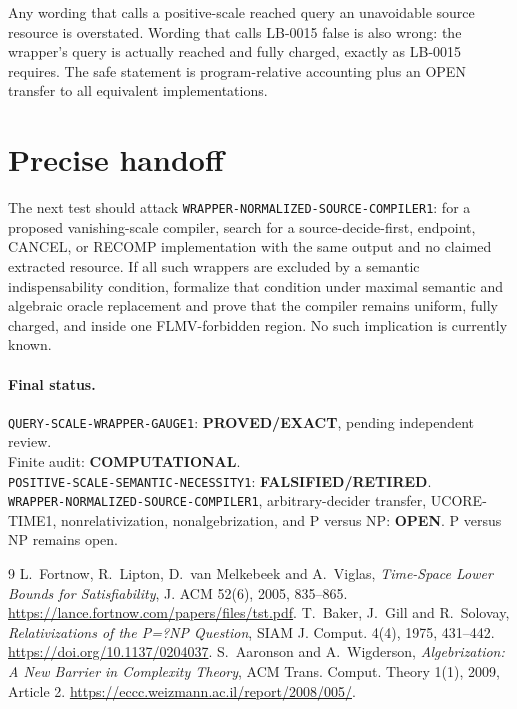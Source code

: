 \documentclass[11pt]{article}
\newcommand{\EXACT}{\textbf{PROVED/EXACT}}
\newcommand{\COMP}{\textbf{COMPUTATIONAL}}
\newcommand{\OPEN}{\textbf{OPEN}}
\newcommand{\RETIRED}{\textbf{FALSIFIED/RETIRED}}
\begin{document}
Any wording that calls a positive-scale reached query an unavoidable source
resource is overstated.  Wording that calls LB-0015 false is also wrong: the
wrapper's query is actually reached and fully charged, exactly as LB-0015
requires.  The safe statement is program-relative accounting plus an OPEN
transfer to all equivalent implementations.

\section{Precise handoff}

The next test should attack \texttt{WRAPPER-NORMALIZED-SOURCE-COMPILER1}:
for a proposed vanishing-scale compiler, search for a source-decide-first,
endpoint, CANCEL, or RECOMP implementation with the same output and no
claimed extracted resource.  If all such wrappers are excluded by a semantic
indispensability condition, formalize that condition under maximal semantic
and algebraic oracle replacement and prove that the compiler remains uniform,
fully charged, and inside one FLMV-forbidden region.  No such implication is
currently known.

\paragraph{Final status.}
\texttt{QUERY-SCALE-WRAPPER-GAUGE1}: \EXACT, pending independent review.\\
Finite audit: \COMP.\\
\texttt{POSITIVE-SCALE-SEMANTIC-NECESSITY1}: \RETIRED.\\
\texttt{WRAPPER-NORMALIZED-SOURCE-COMPILER1}, arbitrary-decider transfer,
UCORE-TIME1, nonrelativization, nonalgebrization, and P versus NP: \OPEN.
P versus NP remains open.

\begin{thebibliography}{9}
 L.~Fortnow, R.~Lipton, D.~van Melkebeek and A.~Viglas,
\emph{Time-Space Lower Bounds for Satisfiability}, J. ACM 52(6), 2005,
835--865. \url{https://lance.fortnow.com/papers/files/tst.pdf}.
 T.~Baker, J.~Gill and R.~Solovay,
\emph{Relativizations of the P=?NP Question}, SIAM J. Comput. 4(4), 1975,
431--442. \url{https://doi.org/10.1137/0204037}.
 S.~Aaronson and A.~Wigderson,
\emph{Algebrization: A New Barrier in Complexity Theory}, ACM Trans.
Comput. Theory 1(1), 2009, Article 2.
\url{https://eccc.weizmann.ac.il/report/2008/005/}.
\end{thebibliography}

\end{document}

